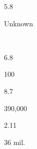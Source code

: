 \begin{description}[font=\normalfont,style=nextline]
\begin{multicols}{2}
\begin{description}[font=\normalfont\itshape,noitemsep]
 \end{description}\end{multicols}
\item[\langnameTanna] 
 \begin{multicols}{2}\begin{description}[font=\normalfont\itshape,noitemsep] 
 \item[] 
 \item[\pbnumberabbr] 5.8 
 \item[\family] \famAustronesian 
 \item[]
\item[\nativespeakers] Unknown 
 \item[\region] \regionTannaIsland\ \Brackets{\regionVanuatu} 
 \end{description}\end{multicols}
\item[\langnameTariana] 
 \begin{multicols}{2}\begin{description}[font=\normalfont\itshape,noitemsep] 
 \item[] 
 \item[\pbnumberabbr] 6.8 
 \item[\family] \famArawakan 
 \item[]
\item[\nativespeakers] 100 
 \item[\region] \regionBrazil 
 \end{description}\end{multicols}
\item[\langnameTetum] 
 \begin{multicols}{2}\begin{description}[font=\normalfont\itshape,noitemsep] 
 \item[] 
 \item[\pbnumberabbr] 8.7 
 \item[\family] \famAustronesian 
 \item[]
\item[\nativespeakers] 390,000 
 \item[\region] \regionEastTimor 
 \end{description}\end{multicols}
\item[\langnameThai] 
 \begin{multicols}{2}\begin{description}[font=\normalfont\itshape,noitemsep] 
 \item[] 
 \item[\pbnumberabbr] 2.11 
 \item[\family] \famKraDai 
 \item[]
\item[\nativespeakers] 36 mil. 
 \item[\region] \regionThailand 
 \end{description}\end{multicols}



\end{description}
